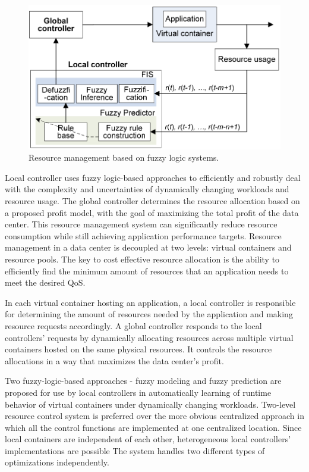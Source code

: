 \documentclass[12pt]{article} %
\begin{document}
\begin{figure}[h!]
  \centering
   \includegraphics[scale=0.50]{fuzzy_block_dia.png}
  \caption{Resource management based on fuzzy logic systems.}
\end{figure}

Local controller uses fuzzy logic-based approaches to efficiently and robustly deal with the complexity and uncertainties of dynamically
changing workloads and resource usage. The global controller
determines the resource allocation based on a proposed
profit model, with the goal of maximizing the total
profit of the data center. This resource
management system can significantly reduce resource consumption
while still achieving application performance targets. Resource
management in a data center is decoupled at two levels:
virtual containers and resource pools. The key to cost effective
resource allocation is the ability to efficiently find
the minimum amount of resources that an application needs
to meet the desired QoS.





In each virtual container hosting an
application, a local controller is responsible for determining
the amount of resources needed by the application and making
resource requests accordingly. A global controller responds
to the local controllers’ requests by dynamically allocating
resources across multiple virtual containers hosted
on the same physical resources. It controls the resource allocations
in a way that maximizes the data center’s profit.




Two fuzzy-logic-based approaches - fuzzy modeling and
fuzzy prediction are proposed for use by local controllers
in automatically learning of runtime behavior of virtual containers
under dynamically changing workloads. Two-level resource control system is preferred over
the more obvious centralized approach in which all the control
functions are implemented at one centralized location.
Since local containers are independent of each other, heterogeneous
local controllers’ implementations are possible
The system handles two different types of
optimizations independently. 
\end{document}
